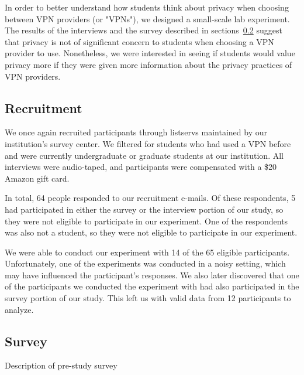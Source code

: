 In order to better understand how students think about privacy when choosing between VPN providers (or "VPNs"), we designed a small-scale lab experiment. 
The results of the interviews and the survey described in sections~\ref{} suggest that privacy is not of significant concern to students when choosing a VPN provider to use.
Nonetheless, we were interested in seeing if students would value privacy more if they were given more information about the privacy practices of VPN providers.

\subsection{Recruitment} 
We once again recruited participants through listservs maintained by our institution's survey center.
We filtered for students who had used a VPN before and were currently undergraduate or graduate students at our institution.
All interviews were audio-taped, and participants were compensated with a \$20 Amazon gift card.

In total, 64 people responded to our recruitment e-mails.
Of these respondents, 5 had participated in either the survey or the interview portion of our study, so they were not eligible to participate in our experiment.
One of the respondents was also not a student, so they were not eligible to participate in our experiment.

We were able to conduct our experiment with 14 of the 65 eligible participants. 
Unfortunately, one of the experiments was conducted in a noisy setting, which may have influenced the participant's responses.
We also later discovered that one of the participants we conducted the experiment with had also participated in the survey portion of our study.
This left us with valid data from 12 participants to analyze.

\subsection{Survey} 
Description of pre-study survey

 
